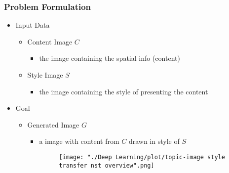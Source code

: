 \subsubsection{Problem Formulation}
\begin{itemize}
\item Input Data
	\begin{itemize}
	\item Content Image $C$
		\begin{itemize}
		\item the image containing the spatial info (content)
		\end{itemize}
	\item Style Image $S$
		\begin{itemize}
		\item the image containing the style of presenting the content
		\end{itemize}
	\end{itemize}
\item Goal
	\begin{itemize}
	\item Generated Image $G$
		\begin{itemize}
		\item a image with content from $C$ drawn in style of $S$
		\begin{figure}[ht]
		\texttt{[image: "./Deep Learning/plot/topic-image style transfer nst overview".png]}
		\end{figure}
		\end{itemize}
	\end{itemize}
\end{itemize}

